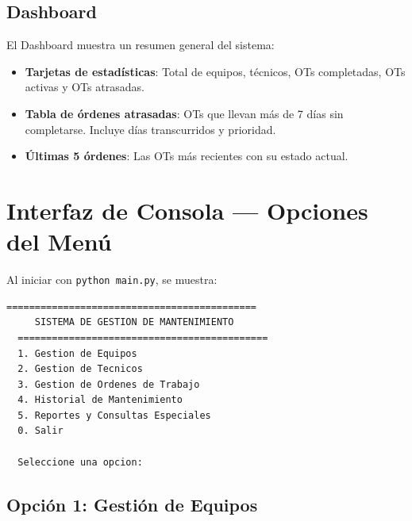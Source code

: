 \documentclass[12pt, a4paper]{article}
\begin{document}
\subsection{Dashboard}

El Dashboard muestra un resumen general del sistema:

\begin{itemize}[leftmargin=2em]
    \item \textbf{Tarjetas de estad\'isticas}: Total de equipos, t\'ecnicos, OTs completadas, OTs activas y OTs atrasadas.
    \item \textbf{Tabla de \'ordenes atrasadas}: OTs que llevan m\'as de 7 d\'ias sin completarse. Incluye d\'ias transcurridos y prioridad.
    \item \textbf{\'Ultimas 5 \'ordenes}: Las OTs m\'as recientes con su estado actual.
\end{itemize}

\newpage
\section{Interfaz de Consola --- Opciones del Men\'u}

Al iniciar con \texttt{python main.py}, se muestra:

\begin{lstlisting}[style=console]
  ============================================
     SISTEMA DE GESTION DE MANTENIMIENTO
  ============================================
  1. Gestion de Equipos
  2. Gestion de Tecnicos
  3. Gestion de Ordenes de Trabajo
  4. Historial de Mantenimiento
  5. Reportes y Consultas Especiales
  0. Salir

  Seleccione una opcion:
\end{lstlisting}

\subsection{Opci\'on 1: Gesti\'on de Equipos}
\end{document}
